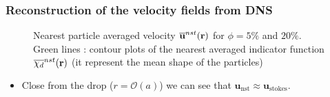 \documentclass{sintefbeamer}
\begin{document}
\begin{frame}
  \frametitle{Reconstruction of the velocity fields from DNS}
  \begin{figure}[h!]
    \centering
    \caption{Nearest particle averaged velocity $\overline{\textbf{u}}^{nst}(\textbf{r})$ for  $\phi = 5\%$ and $20\%$.
    Green lines : contour plots of the nearest averaged indicator function $\overline{\chi_d}^{nst}(\textbf{r})$ (it represent the mean shape of the particles)}
    \label{fig:Stream}
  \end{figure}
  
  \begin{itemize}
    \item Close from the drop ($r=\mathcal{O}(a)$) we can see that $\textbf{u}_\text{nst} \approx \textbf{u}_\text{stokes}$. 
  \end{itemize}
\end{frame}
\end{document}
